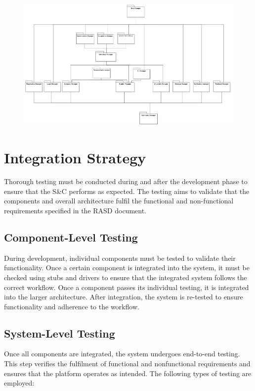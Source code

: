 \begin{figure}[H]
    \centering
    \includegraphics[width=1\linewidth]{DD//Images//Implementation Images/final.png}
    \label{fig:enter-label}
\end{figure}


\section{Integration Strategy}

Thorough testing must be conducted during and after the development phase to ensure that the S\&C performs as expected. The testing aims to validate that the components and overall architecture fulfil the functional and non-functional requirements specified in the RASD document.

\subsection*{Component-Level Testing}
During development, individual components must be tested to validate their functionality. Once a certain component is integrated into the system, it must be checked using stubs and drivers to ensure that the integrated system follows the correct workflow. Once a component passes its individual testing, it is integrated into the larger architecture. After integration, the system is re-tested to ensure functionality and adherence to the workflow.

\subsection*{System-Level Testing}
Once all components are integrated, the system undergoes end-to-end testing. This step verifies the fulfilment of functional and nonfunctional requirements and ensures that the platform operates as intended. The following types of testing are employed:

